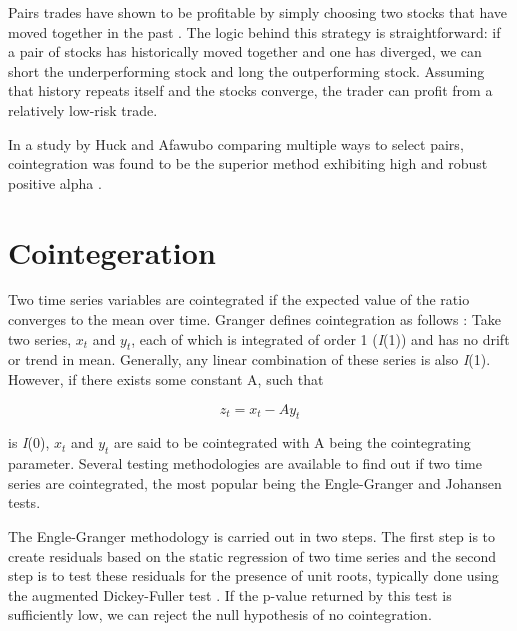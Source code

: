 \documentclass{UoYCSproject}
\begin{document}
Pairs trades have shown to be profitable by simply choosing two stocks that have moved together in the past \parencite{pairshistory}. The logic behind this strategy is straightforward: if a pair of stocks has historically moved together and one has diverged, we can short the underperforming stock and long the outperforming stock. Assuming that history repeats itself and the stocks converge, the trader can profit from a relatively low-risk trade.

In a study by Huck and Afawubo comparing multiple ways to select pairs, cointegration was found to be the superior method exhibiting high and robust positive alpha \parencite{cointsupport}.

\section{Cointegeration}

Two time series variables are cointegrated if the expected value of the ratio converges to the mean over time. Granger defines cointegration as follows \parencite{cointdef}:
Take two series, $x_{t}$ and $y_{t}$, each of which is integrated of order 1 (\emph{I}(1)) and has no drift or trend in mean. Generally, any linear combination of these series is also \emph{I}(1). However, if there exists some constant A, such that

\[z_t = x_t - Ay_t\]

is \emph{I}(0), $x_t$ and $y_t$ are said to be cointegrated with A being the cointegrating parameter. Several testing methodologies are available to find out if two time series are cointegrated, the most popular being the Engle-Granger and Johansen tests.

The Engle-Granger methodology is carried out in two steps. The first step is to create residuals based on the static regression of two time series and the second step is to test these residuals for the presence of unit roots, typically done using the augmented Dickey-Fuller test \parencite{englegranger} \parencite{adf}. If the p-value returned by this test is sufficiently low, we can reject the null hypothesis of no cointegration.
\end{document}
